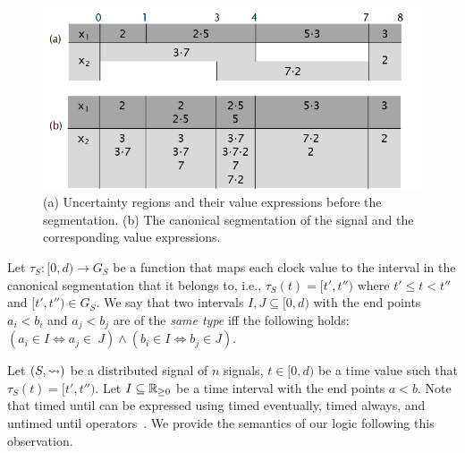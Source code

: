 \begin{figure} 
	\centering
	\includegraphics[scale=0.4]{valexpr.png}
	\caption{(a) Uncertainty regions and their value expressions before the segmentation. (b) The canonical segmentation of the signal and the corresponding value expressions.\label{fig:valexpr}}
\end{figure}

Let $\tau_S : [0,d) \to G_S$ be a function that maps each clock value to the interval in the canonical segmentation that it belongs to, i.e., $\tau_S(t) = [t',t'')$ where $t' \leq t < t''$ and $[t',t'') \in G_S$.
We say that two intervals $I, J \subseteq [0,d)$ with the end points $a_i < b_i$ and $a_j < b_j$ are of the \emph{same type} iff the following holds: $(a_i \in I \iff a_j \in~J) \land (b_i \in I \iff b_j \in J)$.

Let $(S, {\rightsquigarrow})$ be a distributed signal of $n$ signals, $t \in [0,d)$ be a time value such that $\tau_S(t) = [t', t'')$.
Let $I \subseteq \mathbb{R}_{\geq 0}$ be a time interval with the end points $a < b$.
Note that timed until can be expressed using timed eventually, timed always, and untimed until operators~\cite{MalerN13}.
We provide the semantics of our logic following this observation.

